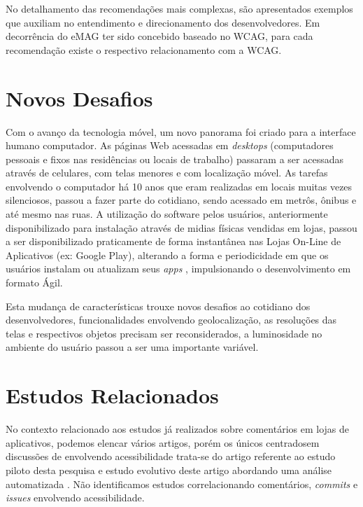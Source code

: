 \documentclass[
	12pt,				%
	oneside,			%
	a4paper,			%
	english,			%
	brazil				%
	]{abntex2ppgsi}
\begin{document}
No detalhamento das recomendações mais complexas, são apresentados exemplos que auxiliam no entendimento e direcionamento dos desenvolvedores. Em decorrência do eMAG ter sido concebido baseado no WCAG, para cada recomendação existe o respectivo relacionamento com a WCAG.


 
\section{Novos Desafios}
Com o avanço da tecnologia móvel, um novo panorama foi criado para a interface humano computador. As páginas Web acessadas em \textit{desktops} (computadores pessoais e fixos nas residências ou locais de trabalho) passaram a ser acessadas através de celulares, com telas menores e com localização móvel. As tarefas envolvendo o computador há 10 anos que eram realizadas em locais muitas vezes silenciosos, passou a fazer parte do cotidiano, sendo acessado em metrôs, ônibus e até mesmo nas ruas. A utilização do software pelos usuários, anteriormente disponibilizado para instalação através de midias físicas vendidas em lojas, passou a ser disponibilizado praticamente de forma instantânea nas Lojas On-Line de Aplicativos (ex: Google Play), alterando a forma e periodicidade em que os usuários instalam ou atualizam seus \textit{apps} \cite{nayebi}, impulsionando o desenvolvimento em formato Ágil.

Esta mudança de características trouxe novos desafios ao cotidiano dos desenvolvedores, funcionalidades envolvendo geolocalização, as resoluções das telas e respectivos objetos precisam ser reconsiderados, a luminosidade no ambiente do usuário passou a ser uma importante variável.

\section{Estudos Relacionados}
No contexto relacionado aos estudos já realizados sobre comentários em lojas de aplicativos, podemos elencar vários artigos, porém os únicos centradosem discussões de envolvendo acessibilidade trata-se do artigo referente ao estudo piloto desta pesquisa \cite{ihc2019} e estudo evolutivo deste artigo abordando uma análise automatizada \cite{rochestertamjeed}. Não identificamos estudos correlacionando comentários, \textit{commits} e \textit{issues} envolvendo acessibilidade.
\end{document}
